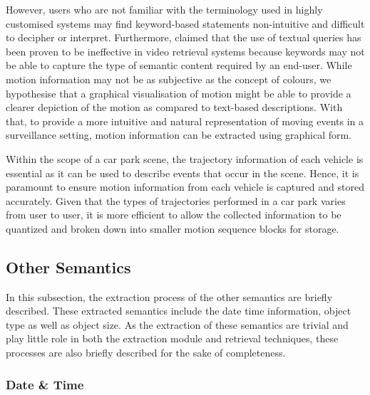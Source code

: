 However, users who are not familiar with the terminology used in highly customised systems may find keyword-based statements non-intuitive and difficult to decipher or interpret.
Furthermore,  claimed that the use of textual queries has been proven to be ineffective in video retrieval systems because keywords may not be able to capture the type of semantic content required by an end-user.
While motion information may not be as subjective as the concept of colours, we hypothesise that a graphical visualisation of motion might be able to provide a clearer depiction of the motion as compared to text-based descriptions.
With that, to provide a more intuitive and natural representation of moving events in a surveillance setting, motion information can be extracted using graphical form.

Within the scope of a car park scene, the trajectory information of each vehicle is essential as it can be used to describe events that occur in the scene.
Hence, it is paramount to ensure motion information from each vehicle is captured and stored accurately.
Given that the types of trajectories performed in a car park varies from user to user, %
it is more efficient to allow the collected information to be quantized and broken down into smaller motion sequence blocks for storage.

\subsection{Other Semantics}

In this subsection, the extraction process of the other semantics are briefly described. These extracted semantics include the date time information, object type as well as object size. As the extraction of these semantics are trivial and play little role in both the extraction module and retrieval techniques, these processes are also briefly described for the sake of completeness.

\subsubsection{Date \& Time}

